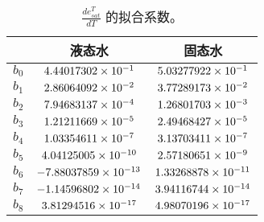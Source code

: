 \begin{table}[]
\centering
\caption{$\frac{d e_{sat}^T}{d T}$ 的拟合系数。}
\label{tab:de_sat_dT的拟合系数}
\begin{tabular}{@{}lcc@{}}
\toprule
     &  液态水  & 固态水                         \\ \midrule
$b_0$ & $\rm 4.44017302 \times 10^{-1}$   & $\rm 5.03277922 \times 10^{-1}$  \\
$b_1$ & $\rm 2.86064092 \times 10^{-2}$  & $\rm 3.77289173 \times 10^{-2}$  \\
$b_2$ & $\rm 7.94683137 \times 10^{-4}$   & $\rm 1.26801703 \times 10^{-3}$  \\
$b_3$ & $\rm 1.21211669 \times 10^{-5}$   & $\rm 2.49468427 \times 10^{-5}$  \\
$b_4$ & $\rm 1.03354611 \times 10^{-7}$   & $\rm 3.13703411 \times 10^{-7}$  \\
$b_5$ & $\rm 4.04125005 \times 10^{-10}$  & $\rm 2.57180651 \times 10^{-9}$  \\
$b_6$ & $\rm -7.88037859 \times 10^{-13}$ & $\rm 1.33268878 \times 10^{-11}$ \\
$b_7$ & $\rm -1.14596802 \times 10^{-14}$ & $\rm 3.94116744 \times 10^{-14}$ \\
$b_8$ & $\rm 3.81294516 \times 10^{-17}$  & $\rm 4.98070196 \times 10^{-17}$ \\\bottomrule
\end{tabular}
\end{table}
